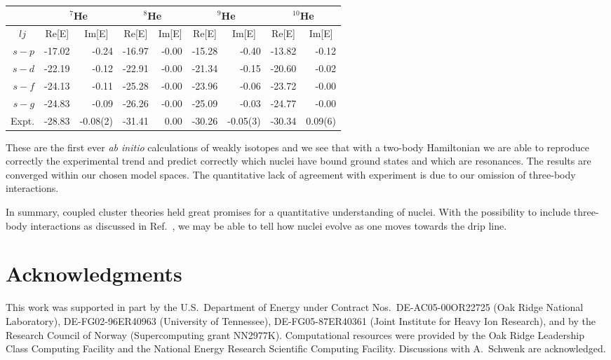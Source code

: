 \documentclass{ws-procs975x65}
\begin{document}
\begin{table}
{\begin{tabular}{rrrrrrrrr}
      \multicolumn{1}{c}{} & \multicolumn{2}{c}{ $^7$He}& \multicolumn{2}{c}{ $^8$He} & \multicolumn{2}{c}{ $^9$He} & \multicolumn{2}{c}{ $^{10}$He} \\
      \hline
      \multicolumn{1}{c}{ $lj$}&\multicolumn{1}{c}{Re[E]}&\multicolumn{1}{c}{Im[E]} &\multicolumn{1}{c}{Re[E]}&\multicolumn{1}{c}{Im[E]} &
      \multicolumn{1}{c}{Re[E]}&\multicolumn{1}{c}{Im[E]} & 
      \multicolumn{1}{c}{Re[E]}&\multicolumn{1}{c}{Im[E]} \\
      \hline
      $s-p$ &  -17.02 & -0.24 &  -16.97  & -0.00 & -15.28 & -0.40 & -13.82 & -0.12  \\
      $s-d $ &  -22.19 & -0.12 &  -22.91  & -0.00 & -21.34 & -0.15 & -20.60 & -0.02  \\
      $s-f$ & -24.13 & -0.11   &  -25.28  &-0.00 & -23.96 & -0.06 & -23.72 & -0.00   \\
      $s-g$ & -24.83  & -0.09  &  -26.26  & -0.00 & -25.09 &  -0.03  & -24.77  & -0.00  \\
      \hline 
      Expt. & -28.83  & -0.08(2) &  -31.41  &  0.00 & -30.26 &  -0.05(3)&  -30.34 &  0.09(6)   \\
   \end{tabular}}  \label{tab:he7_10_conv} 
\end{table} 
These are the first ever {\em ab initio} calculations of weakly isotopes and we see that with a two-body Hamiltonian
we are able to reproduce correctly the experimental trend and predict correctly which nuclei have bound ground states and 
which are resonances.  The results are converged within our chosen model spaces.
The quantitative lack of agreement with experiment is due to our omission of three-body interactions.

In summary, coupled cluster theories held great promises for a quantitative understanding of nuclei. With the possibility
to include three-body interactions as discussed in Ref.~\cite{hagen1}, we may be able to tell how nuclei evolve as one moves
towards the drip line.

\section{Acknowledgments}

This work was supported in part by the U.S.~Department
of Energy under Contract Nos.~DE-AC05-00OR22725 (Oak Ridge National
Laboratory), DE-FG02-96ER40963 (University of Tennessee),
DE-FG05-87ER40361 (Joint Institute for Heavy Ion Research), and by the
Research Council of Norway (Supercomputing grant
NN2977K). Computational resources were provided by the Oak Ridge
Leadership Class Computing Facility and the National Energy Research
Scientific Computing Facility.  Discussions with A.~Schwenk are acknowledged.
\end{document}
